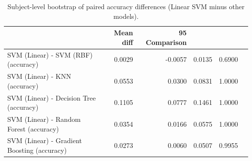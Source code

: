 \begin{table}
\caption{Subject-level bootstrap of paired accuracy differences (Linear SVM minus other models).}
\label{tab:Ext05_subject_level_paired_differences}
\begin{tabular}{lrrrr}
\toprule
 & Mean diff & 95%
Comparison &  &  &  &  \\
\midrule
SVM (Linear) - SVM (RBF) (accuracy) & 0.0029 & -0.0057 & 0.0135 & 0.6900 \\
SVM (Linear) - KNN (accuracy) & 0.0553 & 0.0300 & 0.0831 & 1.0000 \\
SVM (Linear) - Decision Tree (accuracy) & 0.1105 & 0.0777 & 0.1461 & 1.0000 \\
SVM (Linear) - Random Forest (accuracy) & 0.0354 & 0.0166 & 0.0575 & 1.0000 \\
SVM (Linear) - Gradient Boosting (accuracy) & 0.0273 & 0.0060 & 0.0507 & 0.9955 \\
\bottomrule
\end{tabular}
\end{table}
